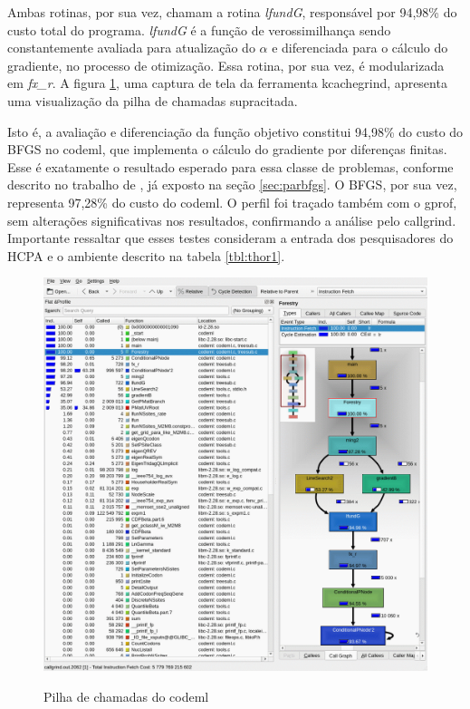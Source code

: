 \documentclass[cic,tc]{iiufrgs}
\begin{document}
Ambas rotinas, por sua vez, chamam a rotina \textit{lfundG}, responsável por
94,98\% do custo total do programa. \textit{lfundG} é a função de
verossimilhança sendo constantemente avaliada para atualização do $\alpha$ e
diferenciada para o cálculo do gradiente, no processo de otimização. Essa
rotina, por sua vez, é modularizada em \textit{fx\_r}. A figura
\ref{fig:kcachegrind}, uma captura de tela da ferramenta kcachegrind, apresenta
uma visualização da pilha de chamadas supracitada.

Isto é, a avaliação e diferenciação da função objetivo constitui 94,98\% do
custo do BFGS no codeml, que implementa o cálculo do gradiente por diferenças
finitas. Esse é exatamente o resultado esperado para essa classe de problemas,
conforme descrito no trabalho de \cite{byrd1988parallel}, já exposto na seção
\ref{sec:parbfgs}. O BFGS, por sua vez, representa 97,28\% do custo do codeml.
O perfil foi traçado também com o gprof, sem alterações significativas nos
resultados, confirmando a análise pelo callgrind. Importante ressaltar que
esses testes consideram a entrada dos pesquisadores do HCPA e o ambiente
descrito na tabela \ref{tbl:thor1}.

\begin{figure} \caption{Pilha de chamadas do codeml} \begin{center}
\includegraphics[width=0.9\linewidth]{img/kcachegrind.png} \end{center}
 \label{fig:kcachegrind} \end{figure}
\end{document}
